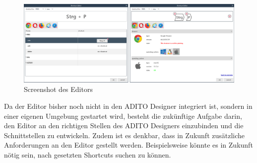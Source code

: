 \vfill

\begin{figure}[H]
	\centering
	\includegraphics[width=1\linewidth]{../graphic/images/screenshots/Neuer-Editor}
	\caption{Screenshot des Editors}
	\label{fig:neuer-editor}
\end{figure}

\vfill

Da der Editor bisher noch nicht in den ADITO Designer integriert ist, sondern in einer eigenen Umgebung gestartet wird, besteht die zukünftige Aufgabe darin, den Editor an den richtigen Stellen des ADITO Designers einzubinden und die Schnittstellen zu entwickeln. Zudem ist es denkbar, dass in Zukunft zusätzliche Anforderungen an den Editor gestellt werden. Beispielsweise könnte es in Zukunft nötig sein, nach gesetzten Shortcuts suchen zu können.
